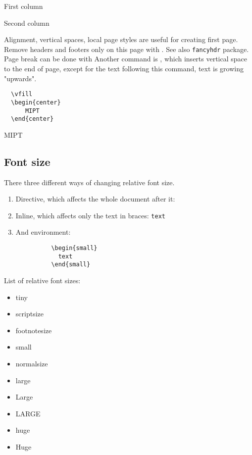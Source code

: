 \begin{mdframed}[style=example]
  \begin{multicols}{2}
    First column

    Second column
  \end{multicols}
\end{mdframed}

Alignment, vertical spaces, local page styles are useful for creating first page.
Remove headers and footers only on this page with \texttt{\thispagestyle{empty}}.
See also \texttt{fancyhdr} package.
Page break can be done with \texttt{\newpage}
Another command is \texttt{\vfill}, which inserts vertical space to the end of page, except for the text following this command, \ie{} text is growing "upwards".
\begin{verbatim}
  \vfill
  \begin{center}
      MIPT
  \end{center}
\end{verbatim}
\vfill
\begin{mdframed}[style=example]
  \begin{center}
    MIPT
  \end{center}
\end{mdframed}


\subsection{Font size}
There three different ways of changing relative font size.

\begin{enumerate}
  \item Directive, which affects the whole document after it: \texttt{\small}
  \item Inline, which affects only the text in braces: \texttt{{\small text}}
  \item And environment:
        \begin{verbatim}
          \begin{small}
            text
          \end{small}
        \end{verbatim}
\end{enumerate}

List of relative font sizes:
\begin{itemize}
  \item {\tiny tiny}
  \item {\scriptsize scriptsize}
  \item {\footnotesize footnotesize}
  \item {\small small}
  \item {\normalsize normalsize}
  \item {\large large}
  \item {\Large Large}
  \item {\LARGE LARGE}
  \item {\huge huge}
  \item {\Huge Huge}
\end{itemize}

